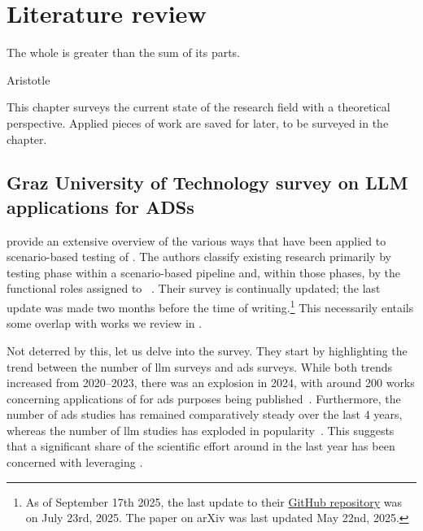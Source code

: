 \chapter{Literature review}\label{chp:literatureReview}

\epigraph{The whole is greater than the sum of its parts.}{Aristotle}

This chapter surveys the current state of the research field with a theoretical
perspective. Applied pieces of work are saved for later, to be surveyed in the
 chapter. 

\section{Graz University of Technology survey on LLM applications for ADSs}

\citeauthor{surveyLLMScenarioBasedTesting} provide an extensive overview of the
various ways that  have been applied to scenario-based testing
of . The authors classify existing research primarily by testing
phase within a scenario-based pipeline and, within those phases, by the
functional roles assigned to
~\cite{surveyLLMScenarioBasedTesting}. Their survey is
continually updated; the last update was made two months before the time of
writing.\footnote{As of September 17th 2025, the last update to their
\href{https://github.com/ftgTUGraz/LLM4ADSTest}{GitHub repository} was on July
23rd, 2025. The paper on arXiv was last updated May 22nd, 2025.} This
necessarily entails some overlap with works we review in .

Not deterred by this, let us delve into the survey. They start by highlighting
the trend between the number of \acrshort{llm} surveys and \acrshort{ads}
surveys. While both trends increased from 2020--2023, there was an explosion in
\num{2024}, with around \num{200} works concerning applications of
 for \acrlong{ads} purposes being published~\cite[p.~1,
Fig.~(b)]{surveyLLMScenarioBasedTesting}. Furthermore, the number of
\acrshort{ads} studies has remained comparatively steady over the last \num{4}
years, whereas the number of \acrshort{llm} studies has exploded in
popularity~\cite[p.~1, Fig.~(a)]{surveyLLMScenarioBasedTesting}. This suggests
that a significant share of the scientific effort around  in the
last year has been concerned with leveraging .

